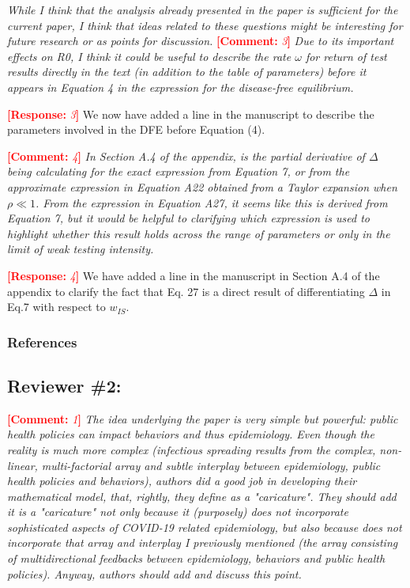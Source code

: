 \documentclass[12pt]{article}
\newcommand{\comment}{\showcomment}
\newcommand{\showcomment}[3]{\textcolor{#1}{\textbf{[#2: }\textsl{#3}\textbf{]}}}
\DeclareRobustCommand\_{\ifmmode\expandafter\subtxt\else\textunderscore\fi}
\newcommand{\com}[1]{\comment{red}{Comment}{#1}} %
\newcommand{\res}[1]{\comment{red}{Response}{#1}} %
\begin{document}
{\it While I think that the analysis already presented in the paper is sufficient for the current paper, I think that ideas related to these questions might be interesting for future research or as points for discussion.}
\com 3 
{\it Due to its important effects on R0, I think it could be useful to describe the rate $\omega$ for return of test results directly in the text (in addition to the table of parameters) before it appears in Equation 4 in the expression for the disease-free equilibrium.}
 
\res 3
We now have added a line in the manuscript to describe the parameters involved in the DFE before Equation (4).

\com 4
{\it In Section A.4 of the appendix, is the partial derivative of $\Delta$ being calculating for the exact expression from Equation 7, or from the approximate expression in Equation A22 obtained from a Taylor expansion when $\rho \ll 1$. From the expression in Equation A27, it seems like this is derived from Equation 7, but it would be helpful to clarifying which expression is used to highlight whether this result holds across the range of parameters or only in the limit of weak testing intensity.}

\res 4
We have added a line in the manuscript in Section A.4 of the appendix to clarify the fact that Eq. 27 is a direct result of differentiating $\Delta$ in Eq.7 with respect to $w_{IS}$.

\subsubsection*{References}



\subsection*{Reviewer \#2:}
\com 1 
{\it The idea underlying the paper is very simple but powerful: public health policies can impact behaviors and thus epidemiology. Even though the reality is much more complex (infectious spreading results from the complex, non-linear, multi-factorial array and subtle interplay between epidemiology, public health policies and behaviors), authors did a good job in developing their mathematical model, that, rightly, they define as a "caricature". They should add it is a "caricature" not only because it (purposely) does not incorporate sophisticated aspects of COVID-19 related epidemiology, but also because does not incorporate that array and interplay I previously mentioned (the array consisting of multidirectional feedbacks between epidemiology, behaviors and public health policies). Anyway, authors should add and discuss this point.}
\end{document}
